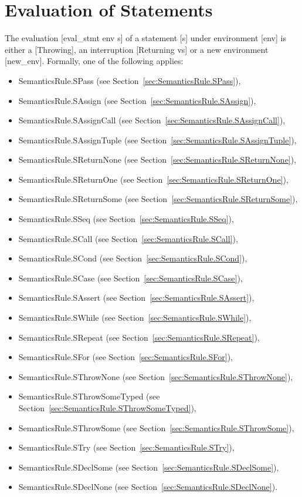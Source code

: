 \documentclass{book}
\begin{document}
\section{Evaluation of Statements}
The evaluation [eval\_stmt env s] of a statement [s] under environment [env] is
either a [Throwing], an interruption [Returning vs] or a new environment
[new\_env]. Formally, one of the following applies:
\begin{itemize}
\item SemanticsRule.SPass (see Section~\ref{sec:SemanticsRule.SPass}), 
\item SemanticsRule.SAssign (see Section~\ref{sec:SemanticsRule.SAssign}), 
\item SemanticsRule.SAssignCall (see Section~\ref{sec:SemanticsRule.SAssignCall}), 
\item SemanticsRule.SAssignTuple (see Section~\ref{sec:SemanticsRule.SAssignTuple}), 
\item SemanticsRule.SReturnNone (see Section~\ref{sec:SemanticsRule.SReturnNone}), 
\item SemanticsRule.SReturnOne (see Section~\ref{sec:SemanticsRule.SReturnOne}), 
\item SemanticsRule.SReturnSome (see Section~\ref{sec:SemanticsRule.SReturnSome}), 
\item SemanticsRule.SSeq (see Section~\ref{sec:SemanticsRule.SSeq}), 
\item SemanticsRule.SCall (see Section~\ref{sec:SemanticsRule.SCall}), 
\item SemanticsRule.SCond (see Section~\ref{sec:SemanticsRule.SCond}), 
\item SemanticsRule.SCase (see Section~\ref{sec:SemanticsRule.SCase}), 
\item SemanticsRule.SAssert (see Section~\ref{sec:SemanticsRule.SAssert}), 
\item SemanticsRule.SWhile (see Section~\ref{sec:SemanticsRule.SWhile}), 
\item SemanticsRule.SRepeat (see Section~\ref{sec:SemanticsRule.SRepeat}), 
\item SemanticsRule.SFor (see Section~\ref{sec:SemanticsRule.SFor}), 
\item SemanticsRule.SThrowNone (see Section~\ref{sec:SemanticsRule.SThrowNone}), 
\item SemanticsRule.SThrowSomeTyped (see Section~\ref{sec:SemanticsRule.SThrowSomeTyped}), 
\item SemanticsRule.SThrowSome (see Section~\ref{sec:SemanticsRule.SThrowSome}), 
\item SemanticsRule.STry (see Section~\ref{sec:SemanticsRule.STry}), 
\item SemanticsRule.SDeclSome (see Section~\ref{sec:SemanticsRule.SDeclSome}), 
\item SemanticsRule.SDeclNone (see Section~\ref{sec:SemanticsRule.SDeclNone}). 
\end{itemize}
\end{document}
